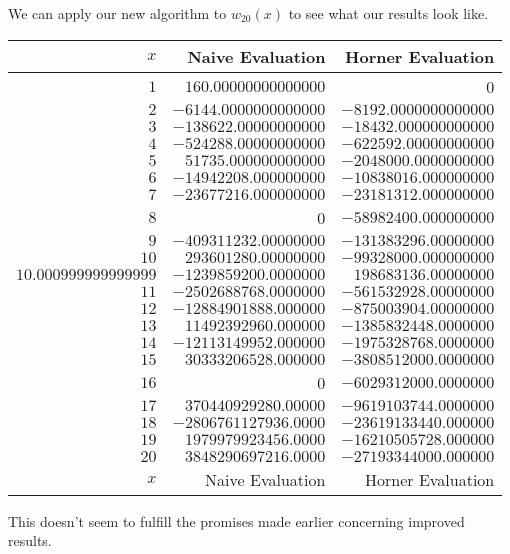 \begin{ex}
We can apply our new algorithm to $w_{20}(x)$ to see what our results
look like.
\begin{center}
  \begin{longtable}{r|r|r}
$x$  & Naive Evaluation      & Horner Evaluation\\\hline
$1$  & $160.00000000000000$  & 0\\
$2$  & $-6144.0000000000000$ & $-8192.0000000000000$\\
$3$  & $-138622.00000000000$ & $-18432.000000000000$\\
$4$  & $-524288.00000000000$ & $-622592.00000000000$\\
$5$  & $51735.000000000000$  & $-2048000.0000000000$\\
$6$  & $-14942208.000000000$ & $-10838016.000000000$\\
$7$  & $-23677216.000000000$ & $-23181312.000000000$\\
$8$  & 0                     & $-58982400.000000000$\\
$9$  & $-409311232.00000000$ & $-131383296.00000000$\\
$10$ & $293601280.00000000$  & $-99328000.000000000$\\
$10.000999999999999$ & $-1239859200.0000000$ & $198683136.00000000$ \\
$11$ & $-2502688768.0000000$ & $-561532928.00000000$\\
$12$ & $-12884901888.000000$ & $-875003904.00000000$\\
$13$ & $11492392960.000000$  & $-1385832448.0000000$\\
$14$ & $-12113149952.000000$ & $-1975328768.0000000$\\
$15$ & $30333206528.000000$  & $-3808512000.0000000$\\
$16$ & 0                     & $-6029312000.0000000$\\
$17$ & $370440929280.00000$  & $-9619103744.0000000$\\
$18$ & $-2806761127936.0000$ & $-23619133440.000000$\\
$19$ & $1979979923456.0000$  & $-16210505728.000000$\\
$20$ & $3848290697216.0000$  & $-27193344000.000000$\\\hline
$x$  & Naive Evaluation & Horner Evaluation
 \end{longtable}
\end{center}
This doesn't seem to fulfill the promises made earlier concerning
improved results.
\end{ex}

